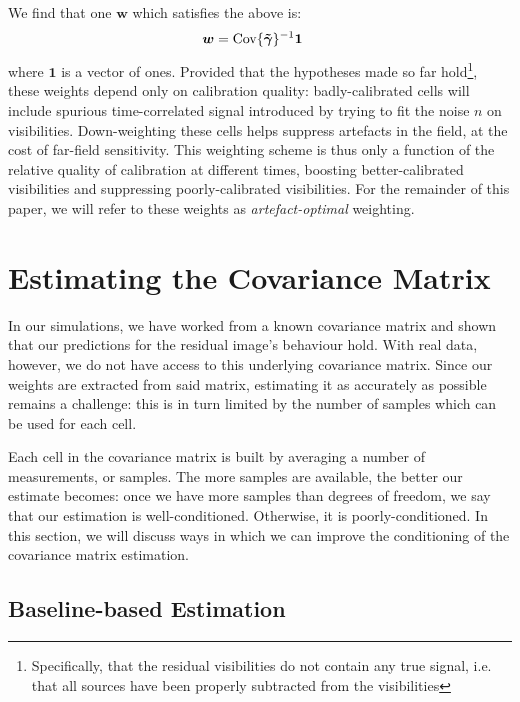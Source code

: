 \pg
We find that one $\bm{w}$ which satisfies the above is:
\begin{align}
\bm{w} &= \textrm{Cov}\{\bm{\tilde{\gamma}}\}^{-1} \mathbf{1}\label{eq.fullweights.analytical}
\end{align}
where $\mathbf{1}$ is a vector of ones. Provided that the hypotheses made so far hold\footnote{Specifically, that the residual visibilities do not contain any true signal, i.e. that all sources have been properly subtracted from the visibilities}, these weights depend only on calibration quality: badly-calibrated cells will include spurious time-correlated signal introduced by trying to fit the noise $n$ on visibilities. Down-weighting these cells helps suppress artefacts in the field, at the cost of far-field sensitivity. This weighting scheme is thus only a function of the relative quality of calibration at different times, boosting better-calibrated visibilities and suppressing poorly-calibrated visibilities. For the remainder of this paper, we will refer to these weights as \emph{artefact-optimal} weighting.

\section{Estimating the Covariance Matrix}\label{section.algorithm}
\pg
In our simulations, we have worked from a known covariance matrix and shown that our predictions for the residual image's behaviour hold. With real data, however, we do not have access to this underlying covariance matrix. Since our weights are extracted from said matrix, estimating it as accurately as possible remains a challenge: this is in turn limited by the number of samples which can be used for each cell.

\pg
Each cell in the covariance matrix is built by averaging a number of measurements, or samples. The more samples are available, the better our estimate becomes: once we have more samples than degrees of freedom, we say that our estimation is well-conditioned. Otherwise, it is poorly-conditioned. In this section, we will discuss ways in which we can improve the conditioning of the covariance matrix estimation.

%
\subsection{Baseline-based Estimation}

